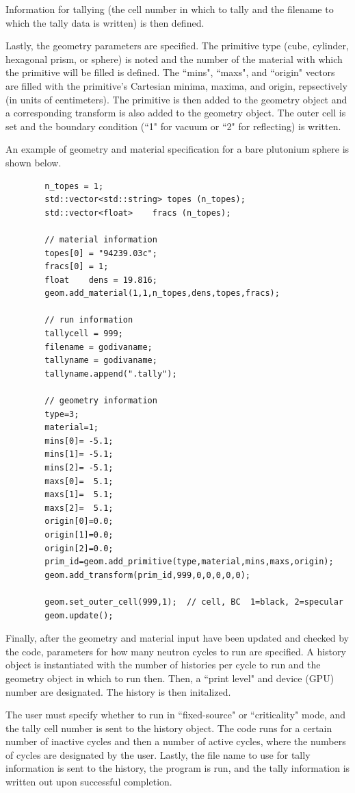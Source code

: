 \documentclass[twoside,a4paper]{refart}
\begin{document}
Information for tallying (the cell number in which to tally and the filename to which the tally data is written) is then defined.

Lastly, the geometry parameters are specified. The primitive type (cube, cylinder, hexagonal prism, or sphere) is noted and the number of the material with which the primitive will be filled is defined. The 
``mins", ``maxs", and ``origin" vectors are filled with the primitive's Cartesian minima, maxima, and origin, repsectively (in units of centimeters). The primitive is then added to the geometry object and a corresponding transform is also added to the geometry object. The outer cell is set and the boundary
condition (``1" for vacuum or ``2" for reflecting) is written.

An example of geometry and material specification for a bare plutonium sphere is shown below.

\begin{verbatim}
		n_topes = 1;
		std::vector<std::string> topes (n_topes);
		std::vector<float>    fracs (n_topes);

		// material information
		topes[0] = "94239.03c";
		fracs[0] = 1;      
		float    dens = 19.816;
		geom.add_material(1,1,n_topes,dens,topes,fracs);
		
		// run information
		tallycell = 999;
		filename = godivaname;
		tallyname = godivaname;
		tallyname.append(".tally");
	
		// geometry information
		type=3;
		material=1;
		mins[0]= -5.1;
		mins[1]= -5.1;
		mins[2]= -5.1;
		maxs[0]=  5.1;
		maxs[1]=  5.1;
		maxs[2]=  5.1;
		origin[0]=0.0;
		origin[1]=0.0;
		origin[2]=0.0;
		prim_id=geom.add_primitive(type,material,mins,maxs,origin);
		geom.add_transform(prim_id,999,0,0,0,0,0);

		geom.set_outer_cell(999,1);  // cell, BC  1=black, 2=specular
		geom.update();
\end{verbatim}

Finally, after the geometry and material input have been updated and checked by the code, parameters for how many neutron cycles to run are specified. A history object is instantiated with the number of
histories per cycle to run and the geometry object in which to run then. Then, a ``print level" and 
device (GPU) number are designated. The history is then initalized.

The user must specify whether to run in ``fixed-source" or ``criticality" mode, and the tally cell number
is sent to the history object. The code runs for a certain number of inactive cycles and then a number of
active cycles, where the numbers of cycles are designated by the user. Lastly, the file name to use for
tally information is sent to the history, the program is run, and the tally information is written out
upon successful completion.
\end{document}
